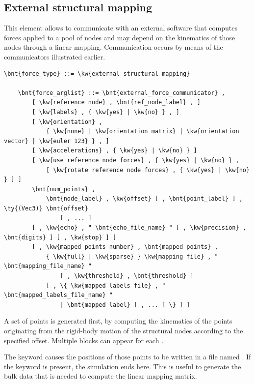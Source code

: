 \subsection{External structural mapping}
\label{sec:EL:FORCE:EXTERNAL:STRUCTURAL_MAPPING}
This element allows to communicate with an external software that computes
forces applied to a pool of nodes and may depend on the kinematics of those
nodes through a linear mapping.
Communication occurs by means of the communicators illustrated earlier.
\begin{Verbatim}[commandchars=\\\{\}]
    \bnt{force_type} ::= \kw{external structural mapping}

    \bnt{force_arglist} ::= \bnt{external_force_communicator} ,
        [ \kw{reference node} , \bnt{ref_node_label} , ]
        [ \kw{labels} , { \kw{yes} | \kw{no} } , ]
        [ \kw{orientation} ,
            { \kw{none} | \kw{orientation matrix} | \kw{orientation vector} | \kw{euler 123} } , ]
        [ \kw{accelerations} , { \kw{yes} | \kw{no} } ]
        [ \kw{use reference node forces} , { \kw{yes} | \kw{no} } ,
            [ \kw{rotate reference node forces} , { \kw{yes} | \kw{no} } ] ]
        \bnt{num_points} ,
            \bnt{node_label} , \kw{offset} [ , \bnt{point_label} ] , \ty{(Vec3)} \bnt{offset}
                [ , ... ]
        [ , \kw{echo} , " \bnt{echo_file_name} " [ , \kw{precision} , \bnt{digits} ] [ , \kw{stop} ] ]
        [ , \kw{mapped points number} , \bnt{mapped_points} ,
            { \kw{full} | \kw{sparse} } \kw{mapping file} , " \bnt{mapping_file_name} "
                [ , \kw{threshold} , \bnt{threshold} ]
            [ , \{ \kw{mapped labels file} , " \bnt{mapped_labels_file_name} "
                | \bnt{mapped_label} [ , ... ] \} ] ]
\end{Verbatim}
A set of  points is generated first,
by computing the kinematics of the points originating
from the rigid-body motion of the structural nodes 
according to the specified offset.
Multiple  blocks can appear for each .

The  keyword causes the positions of those points
to be written in a file named .
If the keyword  is present, the simulation ends here.
This is useful to generate the bulk data that is needed to compute
the linear mapping matrix.


